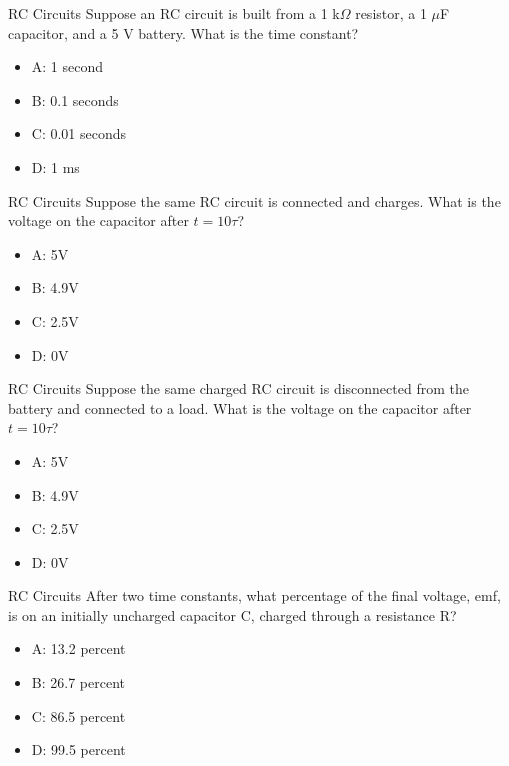 \documentclass{beamer}
\begin{document}
\begin{frame}{RC Circuits}
Suppose an RC circuit is built from a 1 k$\Omega$ resistor, a 1 $\mu$F capacitor, and a 5 V battery.  What is the time constant?
\begin{itemize}
\item A: 1 second
\item B: 0.1 seconds
\item C: 0.01 seconds
\item D: 1 ms
\end{itemize}
\end{frame}

\begin{frame}{RC Circuits}
Suppose the same RC circuit is connected and charges.  What is the voltage on the capacitor after $t = 10\tau$?
\begin{itemize}
\item A: 5V
\item B: 4.9V
\item C: 2.5V
\item D: 0V
\end{itemize}
\end{frame}

\begin{frame}{RC Circuits}
Suppose the same charged RC circuit is disconnected from the battery and connected to a load.  What is the voltage on the capacitor after $t = 10\tau$?
\begin{itemize}
\item A: 5V
\item B: 4.9V
\item C: 2.5V
\item D: 0V
\end{itemize}
\end{frame}

\begin{frame}{RC Circuits}
After two time constants, what percentage of the final voltage, emf, is on an initially uncharged capacitor C, charged through a resistance R?
\begin{itemize}
\item A: 13.2 percent
\item B: 26.7 percent
\item C: 86.5 percent
\item D: 99.5 percent
\end{itemize}
\end{frame}
\end{document}
